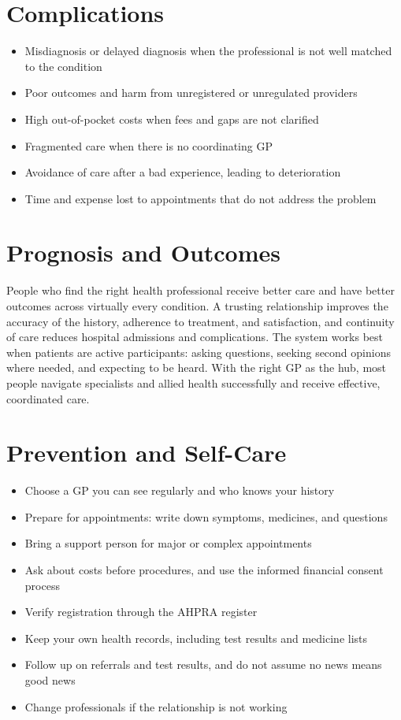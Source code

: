 \section*{Complications}
\begin{itemize}
    \item Misdiagnosis or delayed diagnosis when the professional is not well matched to the condition
    \item Poor outcomes and harm from unregistered or unregulated providers
    \item High out-of-pocket costs when fees and gaps are not clarified
    \item Fragmented care when there is no coordinating GP
    \item Avoidance of care after a bad experience, leading to deterioration
    \item Time and expense lost to appointments that do not address the problem
\end{itemize}

\section*{Prognosis and Outcomes}
People who find the right health professional receive better care and have better outcomes across virtually every condition. A trusting relationship improves the accuracy of the history, adherence to treatment, and satisfaction, and continuity of care reduces hospital admissions and complications. The system works best when patients are active participants: asking questions, seeking second opinions where needed, and expecting to be heard. With the right GP as the hub, most people navigate specialists and allied health successfully and receive effective, coordinated care.

\section*{Prevention and Self-Care}
\begin{itemize}
    \item Choose a GP you can see regularly and who knows your history
    \item Prepare for appointments: write down symptoms, medicines, and questions
    \item Bring a support person for major or complex appointments
    \item Ask about costs before procedures, and use the informed financial consent process
    \item Verify registration through the AHPRA register
    \item Keep your own health records, including test results and medicine lists
    \item Follow up on referrals and test results, and do not assume no news means good news
    \item Change professionals if the relationship is not working
\end{itemize}


